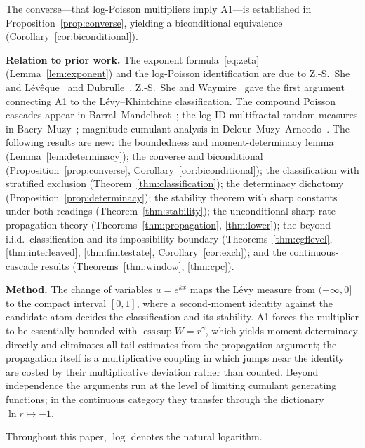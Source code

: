 \documentclass[12pt]{amsart}
\theoremstyle{definition}
\theoremstyle{remark}
\DeclareMathOperator*{\esssup}{ess\,sup}
\begin{document}
The converse---that log-Poisson multipliers imply
A1---is established in Proposition~\ref{prop:converse}, yielding a
biconditional equivalence (Corollary~\ref{cor:biconditional}).

\smallskip
\noindent\textbf{Relation to prior work.}
The exponent formula~\eqref{eq:zeta} (Lemma~\ref{lem:exponent})
and the log-Poisson identification are due to
Z.-S.~She and L\'ev\^eque~\cite{SL94} and Dubrulle~\cite{Dub94}.
Z.-S.~She and Waymire~\cite{SW95} gave the first argument connecting
A1 to the L\'evy--Khintchine classification.  The compound Poisson
cascades appear in Barral--Mandelbrot~\cite{BM02}; the log-ID
multifractal random measures in Bacry--Muzy~\cite{BM03,MB02};
magnitude-cumulant analysis in Delour--Muzy--Arneodo~\cite{DMA01}.
The following results are new: the boundedness and
moment-determinacy lemma (Lemma~\ref{lem:determinacy}); the converse
and biconditional (Proposition~\ref{prop:converse},
Corollary~\ref{cor:biconditional}); the classification with
stratified exclusion (Theorem~\ref{thm:classification}); the
determinacy dichotomy (Proposition~\ref{prop:determinacy}); the
stability theorem with sharp constants under both readings
(Theorem~\ref{thm:stability}); the unconditional sharp-rate
propagation theory (Theorems~\ref{thm:propagation},
\ref{thm:lower}); the beyond-i.i.d.\ classification and its
impossibility boundary (Theorems~\ref{thm:cgflevel},
\ref{thm:interleaved}, \ref{thm:finitestate},
Corollary~\ref{cor:exch}); and the continuous-cascade results
(Theorems~\ref{thm:window}, \ref{thm:cpc}).

\smallskip
\noindent\textbf{Method.}
The change of variables $u = e^{kx}$ maps the L\'evy measure from
$(-\infty,0]$ to the compact interval $[0,1]$, where a second-moment
identity against the candidate atom decides the classification and
its stability.  A1 forces the multiplier to be essentially bounded
with $\esssup W = r^\gamma$, which yields moment determinacy
directly and eliminates all tail estimates from the propagation
argument; the propagation itself is a multiplicative coupling in
which jumps near the identity are costed by their multiplicative
deviation rather than counted.  Beyond independence the arguments
run at the level of limiting cumulant generating functions; in the
continuous category they transfer through the dictionary
$\ln r \mapsto -1$.

\smallskip
Throughout this paper, $\log$ denotes the natural logarithm.


\end{document}
